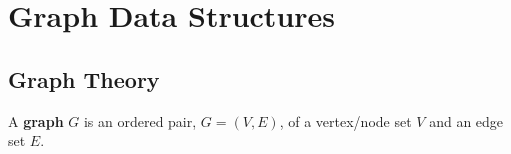 









\section{Graph Data Structures}
\label{sec:GraphDataStructures}

\subsection{Graph Theory}
\label{ssec:GraphTheory}

A {\bf graph} $G$ is an ordered pair, $G = (V,E)$, of a vertex/node set $V$ and an edge set $E$\cite{WikipediaContributors2018a38}. \\

